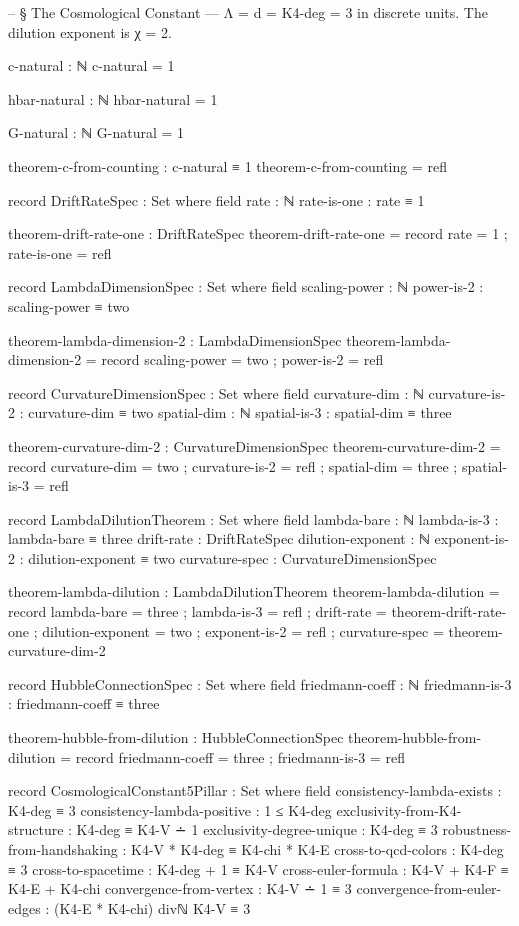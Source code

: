 \documentclass[11pt,a4paper]{book}
\begin{document}
\begin{code}
-- § The Cosmological Constant — Λ = d = K4-deg = 3 in discrete units. The dilution exponent is χ = 2.

c-natural : ℕ
c-natural = 1

hbar-natural : ℕ
hbar-natural = 1

G-natural : ℕ
G-natural = 1

theorem-c-from-counting : c-natural ≡ 1
theorem-c-from-counting = refl

record DriftRateSpec : Set where
  field
    rate : ℕ
    rate-is-one : rate ≡ 1

theorem-drift-rate-one : DriftRateSpec
theorem-drift-rate-one = record { rate = 1 ; rate-is-one = refl }

record LambdaDimensionSpec : Set where
  field
    scaling-power : ℕ
    power-is-2 : scaling-power ≡ two

theorem-lambda-dimension-2 : LambdaDimensionSpec
theorem-lambda-dimension-2 = record { scaling-power = two ; power-is-2 = refl }

record CurvatureDimensionSpec : Set where
  field
    curvature-dim : ℕ
    curvature-is-2 : curvature-dim ≡ two
    spatial-dim : ℕ
    spatial-is-3 : spatial-dim ≡ three

theorem-curvature-dim-2 : CurvatureDimensionSpec
theorem-curvature-dim-2 = record
  { curvature-dim = two ; curvature-is-2 = refl
  ; spatial-dim = three ; spatial-is-3 = refl }

record LambdaDilutionTheorem : Set where
  field
    lambda-bare : ℕ
    lambda-is-3 : lambda-bare ≡ three
    drift-rate : DriftRateSpec
    dilution-exponent : ℕ
    exponent-is-2 : dilution-exponent ≡ two
    curvature-spec : CurvatureDimensionSpec

theorem-lambda-dilution : LambdaDilutionTheorem
theorem-lambda-dilution = record
  { lambda-bare = three ; lambda-is-3 = refl
  ; drift-rate = theorem-drift-rate-one
  ; dilution-exponent = two ; exponent-is-2 = refl
  ; curvature-spec = theorem-curvature-dim-2 }

record HubbleConnectionSpec : Set where
  field
    friedmann-coeff : ℕ
    friedmann-is-3 : friedmann-coeff ≡ three

theorem-hubble-from-dilution : HubbleConnectionSpec
theorem-hubble-from-dilution = record { friedmann-coeff = three ; friedmann-is-3 = refl }

record CosmologicalConstant5Pillar : Set where
  field
    consistency-lambda-exists : K4-deg ≡ 3
    consistency-lambda-positive : 1 ≤ K4-deg
    exclusivity-from-K4-structure : K4-deg ≡ K4-V ∸ 1
    exclusivity-degree-unique : K4-deg ≡ 3
    robustness-from-handshaking : K4-V * K4-deg ≡ K4-chi * K4-E
    cross-to-qcd-colors : K4-deg ≡ 3
    cross-to-spacetime : K4-deg + 1 ≡ K4-V
    cross-euler-formula : K4-V + K4-F ≡ K4-E + K4-chi
    convergence-from-vertex : K4-V ∸ 1 ≡ 3
    convergence-from-euler-edges : (K4-E * K4-chi) divℕ K4-V ≡ 3


\end{code}
\end{document}
